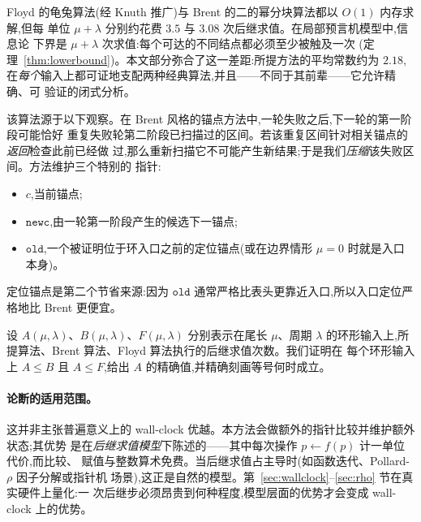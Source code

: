 \documentclass[11pt]{ctexart}
\newcommand{\oldc}{\texttt{old}}
\newcommand{\newc}{\texttt{newc}}
\begin{document}
Floyd 的龟兔算法(经 Knuth 推广)与 Brent 的二的幂分块算法都以 $O(1)$ 内存求解,但每
单位 $\mu+\lambda$ 分别约花费 $3.5$ 与 $3.08$ 次后继求值。在局部预言机模型中,信息论
下界是 $\mu+\lambda$ 次求值:每个可达的不同结点都必须至少被触及一次
(定理~\ref{thm:lowerbound})。本文部分弥合了这一差距:所提方法的平均常数约为 $2.18$,
在\emph{每个}输入上都可证地支配两种经典算法,并且——不同于其前辈——它允许精确、可
验证的闭式分析。

该算法源于以下观察。在 Brent 风格的锚点方法中,一轮失败之后,下一轮的第一阶段可能恰好
重复失败轮第二阶段已扫描过的区间。若该重复区间针对相关锚点的\emph{返回}检查此前已经做
过,那么重新扫描它不可能产生新结果;于是我们\emph{压缩}该失败区间。方法维护三个特别的
指针:
\begin{itemize}[leftmargin=2em]
    \item $c$,当前锚点;
    \item $\newc$,由一轮第一阶段产生的候选下一锚点;
    \item $\oldc$,一个被证明位于环入口之前的定位锚点(或在边界情形 $\mu=0$ 时就是入口本身)。
\end{itemize}
定位锚点是第二个节省来源:因为 $\oldc$ 通常严格比表头更靠近入口,所以入口定位严格地比
Brent 更便宜。

设 $A(\mu,\lambda)$、$B(\mu,\lambda)$、$F(\mu,\lambda)$ 分别表示在尾长 $\mu$、周期
$\lambda$ 的环形输入上,所提算法、Brent 算法、Floyd 算法执行的后继求值次数。我们证明在
每个环形输入上 $A\le B$ 且 $A\le F$,给出 $A$ 的精确值,并精确刻画等号何时成立。

\paragraph{论断的适用范围。}
这并非主张普遍意义上的 wall-clock 优越。本方法会做额外的指针比较并维护额外状态;其优势
是在\emph{后继求值模型}下陈述的——其中每次操作 $p\leftarrow f(p)$ 计一单位代价,而比较、
赋值与整数算术免费。当后继求值占主导时(如函数迭代、Pollard-$\rho$ 因子分解或指针机
场景),这正是自然的模型。第~\ref{sec:wallclock}--\ref{sec:rho} 节在真实硬件上量化:一
次后继步必须昂贵到何种程度,模型层面的优势才会变成 wall-clock 上的优势。
\end{document}
